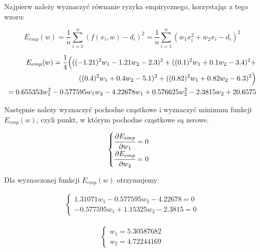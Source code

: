 \documentclass{article}
\begin{document}
Najpierw należy wyznaczyć równanie ryzyka empirycznego, korzystając z tego wzoru:

\begin{equation}
E_{emp}(w) = \frac{1}{n}\sum_{i=1}^n (f(x_i, w) - d_i)^2 =
\frac{1}{n}\sum_{i=1}^n (w_1x_i^2 + w_2x_i - d_i)^2
\end{equation}

\begin{equation*}
    \begin{aligned}
    E_{emp}(w) = \frac{1}{4}\Bigl(
        ((-1.21)^2w_1 - 1.21w_2 - 2.3)^2 +
        ((0.1)^2w_1 + 0.1w_2 - 3.4)^2 + \\
        ((0.4)^2w_1 + 0.4w_2 - 5.1)^2 +
        ((0.82)^2w_1 + 0.82w_2 - 6.3)^2
        \Bigr)\\
    = 0.655353w_1^2 -0.577595w_1w_2 - 4.22678w_1 +
    0.576625w_2^2 - 2.3815w_2 + 20.6575
    \end{aligned}
\end{equation*}

Następnie należy wyznaczyć pochodne cząstkowe i wyznaczyć 
minimum funkcji $E_{emp}(w)$,
czyli punkt, w którym pochodne cząstkowe są zerowe.

\begin{equation}
    \begin{aligned}
        \begin{cases}
            \cfrac{\partial E_{emp}}{\partial w_1} = 0\\
            \cfrac{\partial E_{emp}}{\partial w_2} = 0
        \end{cases}
    \end{aligned}
\end{equation}

Dla wyznaczonej funkcji $E_{emp}(w)$ otrzymujemy:

\begin{equation*}
    \begin{aligned}
        \begin{cases}
            1.31071w_1 - 0.577595w_2 - 4.22678 = 0\\
            -0.577595w_1 + 1.15325w_2 - 2.3815 = 0
        \end{cases}
    \end{aligned}
\end{equation*}

\begin{equation*}
    \begin{aligned}
        \begin{cases}
            w_1 = 5.30587682 \\
            w_2 = 4.72244169
        \end{cases}
    \end{aligned}
\end{equation*}
\end{document}

